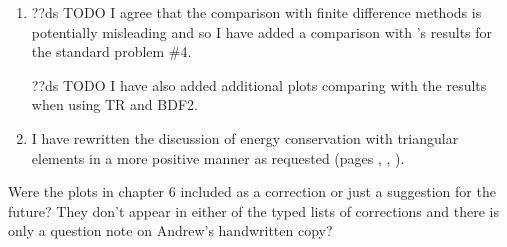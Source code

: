 \documentclass[12pt,a4paper,pdftex]{article}
\begin{document}
\begin{enumerate}
\item ??ds TODO
I agree that the comparison with finite difference methods is potentially misleading and so I have added a comparison with \nmag's results for the \mumag standard problem \#4.

??ds TODO
I have also added additional plots comparing with the results when using TR and BDF2.

\item I have rewritten the discussion of energy conservation with triangular elements in a more positive manner as requested (pages \pageref{sec:triangular-meshes}, \pageref{sec:numer-experiments-conclusions}, \pageref{sec:future-work}).

\end{enumerate}

Were the plots in chapter 6 included as a correction or just a suggestion for the future? They don't appear in either of the typed lists of corrections and there is only a question note on Andrew's handwritten copy?
\end{document}
